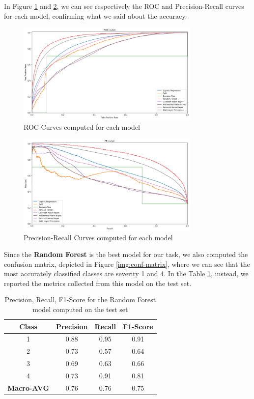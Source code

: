 \documentclass{article}
\begin{document}
In Figure \ref{img:roc-curve} and \ref{img:pr-curve}, we can see respectively the ROC and Precision-Recall curves for each model, confirming what we said about the accuracy.

\begin{figure}[h!]
\centering
\includegraphics[width=0.8\textwidth]{roc-curve}
\caption{ROC Curves computed for each model}
\label{img:roc-curve}
\end{figure}

\begin{figure}[h!]
\centering
\includegraphics[width=0.8\textwidth]{pr-curve}
\caption{Precision-Recall Curves computed for each model}
\label{img:pr-curve}
\end{figure}

Since the \textbf{Random Forest} is the best model for our task, we also computed the confusion matrix, depicted in Figure \ref{img:conf-matrix}, where we can see that the most accurately classified classes are severity 1 and 4. In the Table \ref{tab:random-forest-testset}, instead, we reported the metrics collected from this model on the test set.

\begin{table}[h!]
\center
\begin{tabular}{|c|c|c|c|}
\hline
\textbf{Class} & \textbf{Precision} & \textbf{Recall} & \textbf{F1-Score} \\
\hline
1 & 0.88 & 0.95 & 0.91 \\
\hline
2 & 0.73 & 0.57 & 0.64 \\
\hline
3 & 0.69 & 0.63 & 0.66 \\
\hline
4 & 0.73 & 0.91 & 0.81 \\
\hline
\hline
\textbf{Macro-AVG} & 0.76 & 0.76 & 0.75\\
\hline
\end{tabular}
\caption{Precision, Recall, F1-Score for the Random Forest model computed on the test set}
\label{tab:random-forest-testset}
\end{table}
\end{document}
